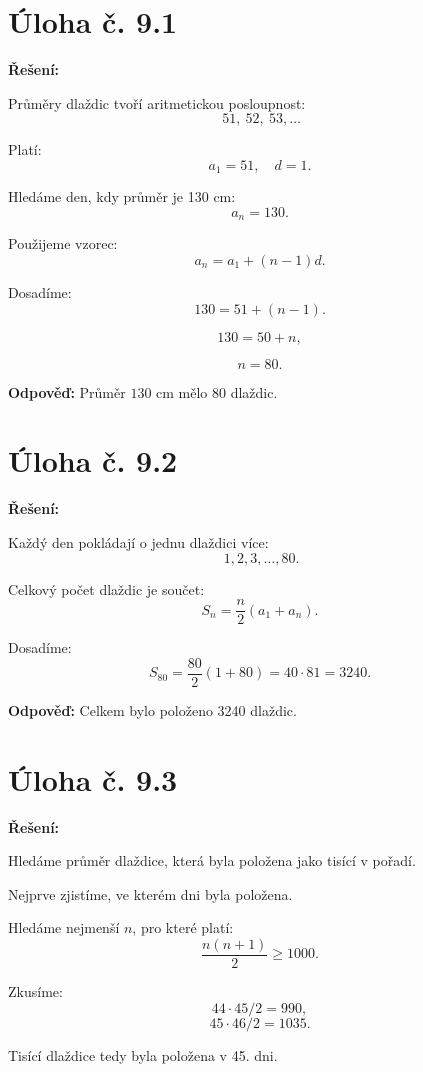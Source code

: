 \documentclass[12pt,a4paper]{article}
\begin{document}
\newpage
\section*{Úloha č. 9.1}

\textbf{Řešení:}

Průměry dlaždic tvoří aritmetickou posloupnost:
\[\
51,\ 52,\ 53,\dots
\]

Platí:
\[
a_1=51,\quad d=1.
\]

Hledáme den, kdy průměr je 130 cm:
\[
a_n=130.
\]

Použijeme vzorec:
\[
a_n=a_1+(n-1)d.
\]

Dosadíme:
\[
130=51+(n-1).
\]

\[
130=50+n,
\]

\[
n=80.
\]

\bigskip

\textbf{Odpověď:}  
Průměr \(130\) cm mělo 80 dlaždic.

\section*{Úloha č. 9.2}

\textbf{Řešení:}

Každý den pokládají o jednu dlaždici více:
\[\
1,2,3,\dots,80.
\]

Celkový počet dlaždic je součet:
\[
S_n=\frac{n}{2}(a_1+a_n).
\]

Dosadíme:
\[
S_{80}=\frac{80}{2}(1+80)=40\cdot 81=3240.
\]

\bigskip

\textbf{Odpověď:}  
Celkem bylo položeno 3240 dlaždic.

\section*{Úloha č. 9.3}

\textbf{Řešení:}

Hledáme průměr dlaždice, která byla položena jako tisící v pořadí.

Nejprve zjistíme, ve kterém dni byla položena.

Hledáme nejmenší \(n\), pro které platí:
\[
\frac{n(n+1)}{2} \ge 1000.
\]

Zkusíme:
\[
44\cdot 45/2 = 990,
\]
\[
45\cdot 46/2 = 1035.
\]

Tisící dlaždice tedy byla položena v 45. dni.
\end{document}
